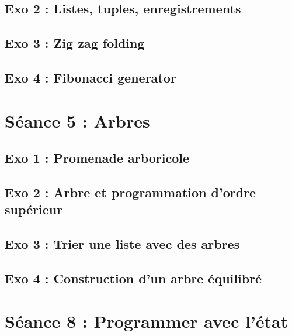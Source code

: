 \subsection{Exo 2 : Listes, tuples, enregistrements}


\subsection{Exo 3 : Zig zag folding}


\subsection{Exo 4 : Fibonacci generator}












\newpage
\section{Séance 5 : Arbres}

\subsection{Exo 1 : Promenade arboricole}


\subsection{Exo 2 : Arbre et programmation d'ordre supérieur}


\subsection{Exo 3 : Trier une liste avec des arbres}


\subsection{Exo 4 : Construction d'un arbre équilibré}







\newpage
\section{Séance 8 : Programmer avec l'état}

